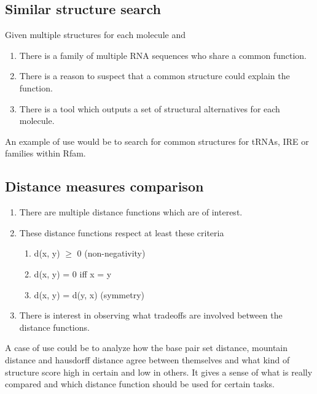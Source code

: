 \documentclass[a4paper, 12pt] {article}
\begin{document}
\subsection*{Similar structure search}

Given multiple structures for each molecule and 


\begin{enumerate}
  \item There is a family of multiple RNA sequences who share a common function.
  \item There is a reason to suspect that a common structure could explain the function. 
  \item There is a tool which outputs a set of structural alternatives for each molecule. 
\end{enumerate}
An example of use would be to search for common structures for tRNAs, IRE or families within Rfam.

\subsection*{Distance measures comparison}
\begin{enumerate}
  \item There are multiple distance functions which are of interest.
  \item These distance functions respect at least these criteria 
    \begin{enumerate}
      \item d(x, y) $\geq$ 0 (non-negativity)
      \item d(x, y) = 0 iff x = y 
      \item d(x, y) = d(y, x) (symmetry)
    \end{enumerate}
  \item There is interest in observing what tradeoffs are involved between the distance functions.
\end{enumerate}
A case of use could be to analyze how the base pair set distance, mountain distance and hausdorff distance
agree between themselves and what kind of structure score high in certain and low in others. It gives a sense
of what is really compared and which distance function should be used for certain tasks.\\
\end{document}
